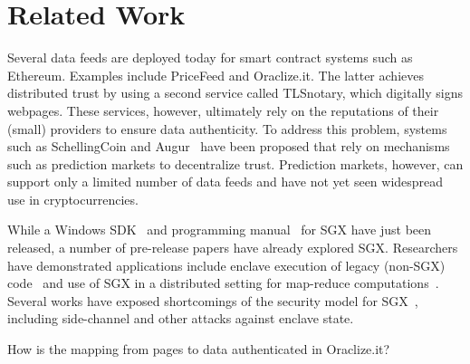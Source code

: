 \section{Related Work}

Several data feeds are deployed today for smart contract systems such as Ethereum. Examples include PriceFeed and Oraclize.it. The latter achieves distributed trust by using a second service called TLSnotary, which digitally signs webpages. These services, however, ultimately rely on the reputations of their (small) providers to ensure data authenticity.  To address this problem, systems such as SchellingCoin and Augur~\cite{} have been proposed that rely on mechanisms such as prediction markets to decentralize trust. Prediction markets, however, can support only a limited number of data feeds and have not yet seen widespread use in cryptocurrencies. 

While a Windows SDK~\cite{} and programming manual~\cite{} for SGX have just been released, a number of pre-release papers have already explored SGX. Researchers have demonstrated applications include enclave execution of legacy (non-SGX) code~\cite{Haven} and use of SGX in a distributed setting for map-reduce computations~\cite{VC3}. Several works have exposed shortcomings of the security model for SGX~\cite{}, including side-channel and other attacks against enclave state. 

How is the mapping from pages to data authenticated in Oraclize.it?
